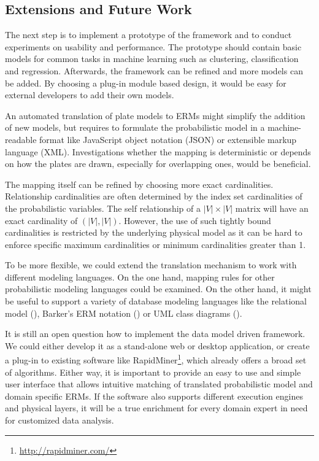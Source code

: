 \subsection{Extensions and Future Work}

The next step is to implement a prototype of the framework and to conduct experiments on usability and performance. The prototype should contain basic models for common tasks in machine learning such as clustering, classification and regression. Afterwards, the framework can be refined and more models can be added. By choosing a plug-in module based design, it would be easy for external developers to add their own models.

An automated translation of plate models to ERMs might simplify the addition of new models, but requires to formulate the probabilistic model in a machine-readable format like JavaScript object notation (JSON) or extensible markup language (XML). Investigations whether the mapping is deterministic or depends on how the plates are drawn, especially for overlapping ones, would be beneficial.

The mapping itself can be refined by choosing more exact cardinalities. Relationship cardinalities are often determined by the index set cardinalities of the probabilistic variables. The self relationship of a $|V| \times |V|$ matrix will have an exact cardinality of $(|V|, |V|)$. However, the use of such tightly bound cardinalities is restricted by the underlying physical model as it can be hard to enforce specific maximum cardinalities or minimum cardinalities greater than 1.

To be more flexible, we could extend the translation mechanism to work with different modeling languages. On the one hand, mapping rules for other probabilistic modeling languages could be examined. On the other hand, it might be useful to support a variety of database modeling languages like the relational model (\cite{codd1970relational}), Barker's ERM notation (\cite{barker1990case}) or UML class diagrams (\cite{rumbaugh2004unified}).

It is still an open question how to implement the data model driven framework. We could either develop it as a stand-alone web or desktop application, or create a plug-in to existing software like RapidMiner\footnote{\url{http://rapidminer.com/}}, which already offers a broad set of algorithms. Either way, it is important to provide an easy to use and simple user interface that allows intuitive matching of translated probabilistic model and domain specific ERMs. If the software also supports different execution engines and physical layers, it will be a true enrichment for every domain expert in need for customized data analysis.

